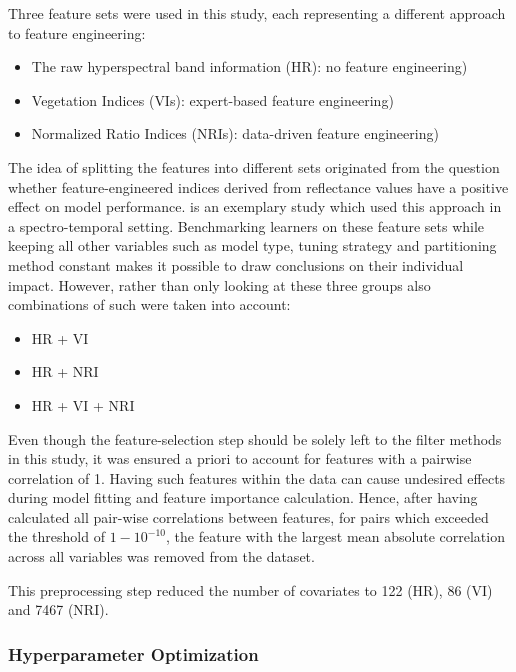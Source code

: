 \documentclass[journal]{IEEEtran}
\begin{document}
Three feature sets were used in this study, each representing a different approach to feature engineering:

\begin{itemize}
	\item The raw hyperspectral band information (HR): no feature engineering) %
	\item Vegetation Indices (\ac{VI}s): expert-based feature engineering)
	\item Normalized Ratio Indices (\ac{NRI}s): data-driven feature engineering)
\end{itemize}

The idea of splitting the features into different sets originated from the question whether feature-engineered indices derived from reflectance values have a positive effect on model performance.
\cite{pena2017} is an exemplary study which used this approach in a spectro-temporal setting.
Benchmarking learners on these feature sets while keeping all other variables such as model type, tuning strategy and partitioning method constant makes it possible to draw conclusions on their individual impact.
However, rather than only looking at these three groups also combinations of such were taken into account:

\begin{itemize}
	\item HR + VI %
	\item HR + NRI
	\item HR + VI + NRI
\end{itemize}

Even though the feature-selection step should be solely left to the filter methods in this study, it was ensured a priori to account for features with a pairwise correlation of 1.
Having such features within the data can cause undesired effects during model fitting and feature importance calculation.
Hence, after having calculated all pair-wise correlations between features, for pairs which exceeded the threshold of $1 - 10^{-10}$, the feature with the largest mean absolute correlation across all variables was removed from the dataset.

This preprocessing step reduced the number of covariates to 122 (HR), 86 (VI) and 7467 (NRI).

\subsubsection{Hyperparameter Optimization}
\end{document}
